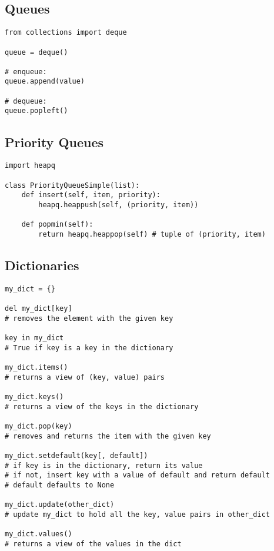 \documentclass[12pt]{article}
\begin{document}
\subsection{Queues}
\begin{lstlisting}
from collections import deque

queue = deque()

# enqueue:
queue.append(value)

# dequeue:
queue.popleft()
\end{lstlisting}

\subsection{Priority Queues}
\begin{lstlisting}
import heapq

class PriorityQueueSimple(list):
	def insert(self, item, priority):
		heapq.heappush(self, (priority, item))

	def popmin(self):
		return heapq.heappop(self) # tuple of (priority, item)
\end{lstlisting}

\subsection{Dictionaries}
\begin{lstlisting}
my_dict = {}

del my_dict[key]
# removes the element with the given key

key in my_dict
# True if key is a key in the dictionary

my_dict.items()
# returns a view of (key, value) pairs

my_dict.keys()
# returns a view of the keys in the dictionary

my_dict.pop(key)
# removes and returns the item with the given key

my_dict.setdefault(key[, default])
# if key is in the dictionary, return its value
# if not, insert key with a value of default and return default
# default defaults to None

my_dict.update(other_dict)
# update my_dict to hold all the key, value pairs in other_dict

my_dict.values()
# returns a view of the values in the dict
\end{lstlisting}
\end{document}
